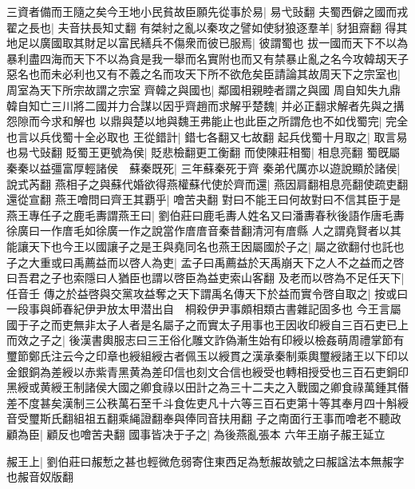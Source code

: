 三資者備而王隨之矣今王地小民貧故臣願先從事於易|{
	易弋䜴翻}
夫蜀西僻之國而戎翟之長也|{
	夫音扶長知丈翻}
有桀紂之亂以秦攻之譬如使豺狼逐羣羊|{
	豺狙齋翻}
得其地足以廣國取其財足以富民繕兵不傷衆而彼已服焉|{
	彼謂蜀也}
拔一國而天下不以為暴利盡四海而天下不以為貪是我一舉而名實附也而又有禁暴止亂之名今攻韓刼天子惡名也而未必利也又有不義之名而攻天下所不欲危矣臣請論其故周天下之宗室也|{
	周室為天下所宗故謂之宗室}
齊韓之與國也|{
	鄰國相親睦者謂之與國}
周自知失九鼎韓自知亡三川將二國并力合謀以因乎齊趙而求解乎楚魏|{
	并必正翻求解者先與之搆怨隙而今求和解也}
以鼎與楚以地與魏王弗能止也此臣之所謂危也不如伐蜀完|{
	完全也言以兵伐蜀十全必取也}
王從錯計|{
	錯七各翻又七故翻}
起兵伐蜀十月取之|{
	取言易也易弋䜴翻}
貶蜀王更號為侯|{
	貶悲檢翻更工衡翻}
而使陳莊相蜀|{
	相息亮翻}
蜀旣屬秦秦以益彊富厚輕諸侯　蘇秦既死|{
	三年蘇秦死于齊}
秦弟代厲亦以遊說顯於諸侯|{
	說式芮翻}
燕相子之與蘇代婚欲得燕權蘇代使於齊而還|{
	燕因肩翻相息亮翻使疏吏翻還從宣翻}
燕王噲問曰齊王其覇乎|{
	噲苦夬翻}
對曰不能王曰何故對曰不信其臣于是燕王專任子之鹿毛夀謂燕王曰|{
	劉伯莊曰鹿毛夀人姓名又曰潘夀春秋後語作唐毛夀徐廣曰一作庴毛如徐廣一作之說當作庴庴音秦昔翻清河有庴縣}
人之謂堯賢者以其能讓天下也今王以國讓子之是王與堯同名也燕王因屬國於子之|{
	屬之欲翻付也託也}
子之大重或曰禹薦益而以啓人為吏|{
	孟子曰禹薦益於天禹崩天下之人不之益而之啓曰吾君之子也索隱曰人猶臣也謂以啓臣為益吏索山客翻}
及老而以啓為不足任天下|{
	任音壬}
傳之於益啓與交黨攻益奪之天下謂禹名傳天下於益而實令啓自取之|{
	按或曰一段事與師春紀伊尹放太甲潜出自　桐殺伊尹事頗相類古書雜記固多也}
今王言屬國于子之而吏無非太子人者是名屬子之而實太子用事也王因收印綬自三百石吏已上而效之子之|{
	後漢書輿服志曰三王俗化雕文詐偽漸生始有印綬以檢姦萌周禮掌節有璽節鄭氏注云今之印章也綬組綬古者佩玉以綬貫之漢承秦制乘輿璽綬諸王以下印以金銀銅為差綬以赤紫青黑黄為差印信也刻文合信也綬受也轉相授受也三百石吏銅印黑綬或黄綬王制諸侯大國之卿食祿以田計之為三十二夫之入戰國之卿食祿萬鍾其僭差不度甚矣漢制三公秩萬石至千斗食佐吏凡十六等三百石吏第十等其奉月四十斛綬音受璽斯氏翻組祖五翻乘䋲證翻奉與俸同音扶用翻}
子之南面行王事而噲老不聽政顧為臣|{
	顧反也噲苦夬翻}
國事皆决于子之|{
	為後燕亂張本}
六年王崩子赧王延立

赧王上|{
	劉伯莊曰赧慙之甚也輕微危弱寄住東西足為慙赧故號之曰赧諡法本無赧字也赧音奴版翻}



